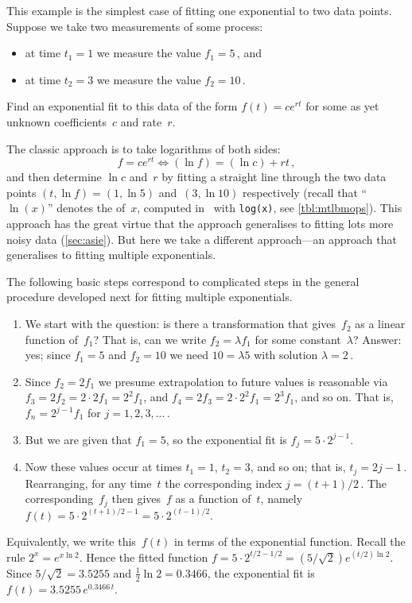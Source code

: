 \begin{example} \label{eg:eidd1}
This example is the simplest case of fitting one exponential to two data points.
Suppose we take two measurements of some process: 
\begin{itemize}
\item at time \(t_1=1\) we measure the value \(f_1=5\)\,, and 
\item at time \(t_2=3\) we measure the value \(f_2=10\)\,.
\end{itemize}
Find an exponential fit to this data of the form \(f(t)=ce^{rt}\) for some as yet unknown coefficients~\(c\) and rate~\(r\).
\begin{solution} 
The classic approach is to take logarithms of both sides:
\begin{equation*}
f=ce^{rt} \iff (\ln f)=(\ln c)+rt\,,
\end{equation*}
and then determine \(\ln c\) and~\(r\) by fitting a straight line through the two data points \((t,\ln f)=(1,\ln5)\) and~\((3,\ln10)\) respectively
(recall that ``\(\ln(x)\)'' denotes the  of~\(x\),  computed in \script\ with \verb|log(x)|, see \autoref{tbl:mtlbmops}).
This approach has the great virtue that the approach generalises to fitting lots more noisy data (\autoref{sec:asie}).
But here we take a different approach---an approach that generalises to fitting multiple exponentials.


The following basic steps correspond to complicated steps in the general procedure developed next for fitting multiple exponentials.
\begin{enumerate}
\item We start with the question: is there a transformation that gives~\(f_2\) as a linear function of~\(f_1\)?  That is, can we write \(f_2=\lambda f_1\) for some constant~\(\lambda\)?
Answer: yes; since \(f_1=5\) and \(f_2=10\) we need \(10=\lambda5\) with solution \(\lambda=2\)\,.
\item  Since \(f_2=2f_1\) we presume extrapolation to future values is reasonable via \(f_3=2f_2=2\cdot2f_1=2^2f_1\), and \(f_4=2f_3=2\cdot2^2f_1=2^3f_1\), and so on.   
That is, \(f_n=2^{j-1}f_1\) for \(j=1,2,3,\ldots\)\,.
\item But we are given that \(f_1=5\), so the exponential fit is \(f_j=5\cdot2^{j-1}\).
\item Now these values occur at times \(t_1=1\), \(t_2=3\), and so on; that is, \(t_j=2j-1\)\,.
Rearranging, for any time~\(t\) the corresponding index \(j=(t+1)/2\)\,.
The corresponding~\(f_j\) then gives~\(f\) as a function of~\(t\), namely \(f(t) =5\cdot 2^{(t+1)/2-1} =5\cdot 2^{(t-1)/2} \).

\end{enumerate}
Equivalently, we write this~\(f(t)\) in terms of the exponential function.
Recall the rule \(2^x=e^{x\ln 2}\).
Hence the fitted function \(f=5\cdot 2^{t/2-1/2} =(5/\sqrt2)e^{(t/2)\ln2}\). 
Since \(5/\sqrt2=3.5255\) and \(\frac12\ln 2=0.3466\), the exponential fit is \(f(t)=3.5255\,e^{0.3466\,t}\).
\end{solution}
\end{example}


